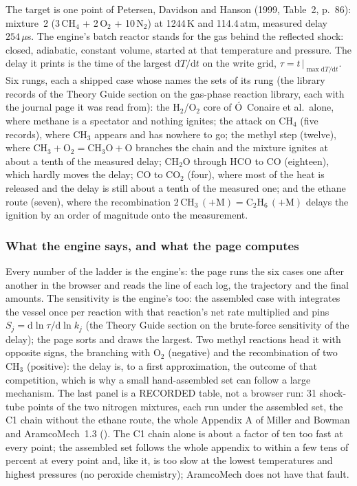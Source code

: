 \documentclass[11pt,a4paper]{article}
\begin{document}
The target is one point of Petersen, Davidson and Hanson (1999, Table~2, p.~86):
mixture~2 (3\,CH$_4$ + 2\,O$_2$ + 10\,N$_2$) at 1244\,K and 114.4\,atm, measured
delay $254\,\mu$s.  The engine's batch reactor stands for the gas behind the
reflected shock: closed, adiabatic, constant volume, started at that temperature
and pressure.  The delay it prints is the time of the largest $\mathrm{d}T/\mathrm{d}t$
on the write grid, $\tau = t\,|_{\max \mathrm{d}T/\mathrm{d}t}$.  Six rungs, each a
shipped case whose  names the sets of its rung (the library
records of the Theory Guide section on the gas-phase reaction library, each with the journal page it was read from):
the H$_2$/O$_2$ core of \'O~Conaire et al.\ alone, where methane is a spectator and
nothing ignites; the attack on CH$_4$ (five records), where CH$_3$ appears and has
nowhere to go; the methyl step (twelve), where $\mathrm{CH_3 + O_2 = CH_3O + O}$
branches the chain and the mixture ignites at about a tenth of the measured delay;
CH$_2$O through HCO to CO (eighteen), which hardly moves the delay; CO to CO$_2$
(four), where most of the heat is released and the delay is still about a tenth of
the measured one; and the ethane route (seven), where the recombination
$\mathrm{2\,CH_3\,(+M) = C_2H_6\,(+M)}$ delays the ignition by an order of magnitude onto
the measurement.

\subsubsection*{What the engine says, and what the page computes}

Every number of the ladder is the engine's: the page runs the six cases one after
another in the browser and reads the  line of each log, the
trajectory and the final amounts.  The sensitivity is the engine's too: the
assembled case with  integrates the
vessel once per reaction with that reaction's net rate multiplied and pins
$S_j = \mathrm{d}\ln\tau/\mathrm{d}\ln k_j$ (the Theory Guide section on the brute-force sensitivity of the delay);
the page sorts and draws the largest.  Two methyl reactions head it with opposite
signs, the branching with O$_2$ (negative) and the recombination of two CH$_3$
(positive): the delay is, to a first approximation, the outcome of that
competition, which is why a small hand-assembled set can follow a large mechanism.
The last panel is a RECORDED table, not a browser run: 31 shock-tube points of the
two nitrogen mixtures, each run under the assembled set, the C1 chain without the
ethane route, the whole Appendix A of Miller and Bowman and AramcoMech~1.3
().  The C1 chain alone is about a
factor of ten too fast at every point; the assembled set follows the whole
appendix to within a few tens of percent at every point and, like it, is too slow
at the lowest temperatures and highest pressures (no peroxide chemistry);
AramcoMech does not have that fault.
\end{document}
